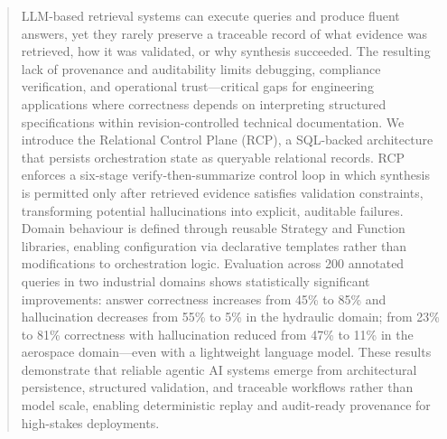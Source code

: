 \documentclass[largeformat]{interact}
\begin{document}
\begin{abstract}
LLM-based retrieval systems can execute queries and produce fluent answers, yet they rarely preserve a traceable record of what evidence was retrieved, how it was validated, or why synthesis succeeded.
The resulting lack of provenance and auditability limits debugging, compliance verification, and operational trust—critical gaps for engineering applications where correctness depends on interpreting structured specifications within revision-controlled technical documentation. 
We introduce the Relational Control Plane (RCP), a SQL-backed architecture that persists orchestration state as queryable relational records. RCP enforces a six-stage verify-then-summarize control loop in which synthesis is permitted only after retrieved evidence satisfies validation constraints, transforming potential hallucinations into explicit, auditable failures. Domain behaviour is defined through reusable Strategy and Function libraries, enabling configuration via declarative templates rather than modifications to orchestration logic.
Evaluation across 200 annotated queries in two industrial domains shows statistically significant improvements: answer correctness increases from 45\% to 85\% and hallucination decreases from 55\% to 5\% in the hydraulic domain; from 23\% to 81\% correctness with hallucination reduced from 47\% to 11\% in the aerospace domain---even with a lightweight language model. These results demonstrate that reliable agentic AI systems emerge from architectural persistence, structured validation, and traceable workflows rather than model scale, enabling deterministic replay and audit-ready provenance for high-stakes deployments.
\end{abstract}
\end{document}
